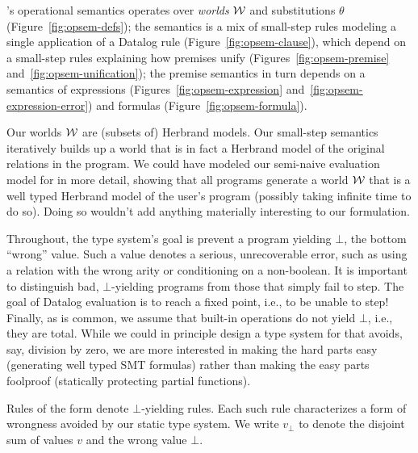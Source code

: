 \documentclass[acmsmall,screen,nonacm]{acmart}
\theoremstyle{definition}
\begin{document}
\Name's operational semantics operates over \emph{worlds} $\mathcal{W}$ and substitutions $\theta$ (Figure~\ref{fig:opsem-defs}); the semantics is a mix of small-step rules modeling a single application of a Datalog rule (Figure~\ref{fig:opsem-clause}), which depend on a small-step rules explaining how premises unify (Figures~\ref{fig:opsem-premise} and~\ref{fig:opsem-unification}); the premise semantics in turn depends on a semantics of expressions (Figures~\ref{fig:opsem-expression} and~\ref{fig:opsem-expression-error}) and formulas (Figure~\ref{fig:opsem-formula}).

Our worlds $\mathcal{W}$ are (subsets of) Herbrand models.
%
Our small-step semantics iteratively builds up a world that is in fact
a Herbrand model of the original relations in the program. 
%
We could have modeled our semi-naive evaluation model for \Name in
more detail, showing that all programs generate a world $\mathcal{W}$ that
is a well typed Herbrand model of the user's program (possibly taking
infinite time to do so). Doing so wouldn't add anything materially
interesting to our formulation.

Throughout, the type system's goal is prevent a program yielding
$\bot$, the bottom ``wrong'' value.
%
Such a value denotes a serious, unrecoverable error, such as using a
relation with the wrong arity or conditioning on a non-boolean.
%
It is important to distinguish bad, $\bot$-yielding programs from
those that simply fail to step. The goal of Datalog evaluation is to
reach a fixed point, i.e., to be unable to step!
%
Finally, as is common, we assume that built-in operations do not yield
$\bot$, i.e., they are total. While we could in principle design a
type system for \Name that avoids, say, division by zero, we are more
interested in making the hard parts easy (generating well typed SMT
formulas) rather than making the easy parts foolproof (statically
protecting partial functions).

Rules of the form  denote $\bot$-yielding rules. Each
such rule characterizes a form of wrongness avoided by our static type
system.
%
We write $v_\bot$ to denote the disjoint sum of values $v$ and the
wrong value $\bot$.
\end{document}
